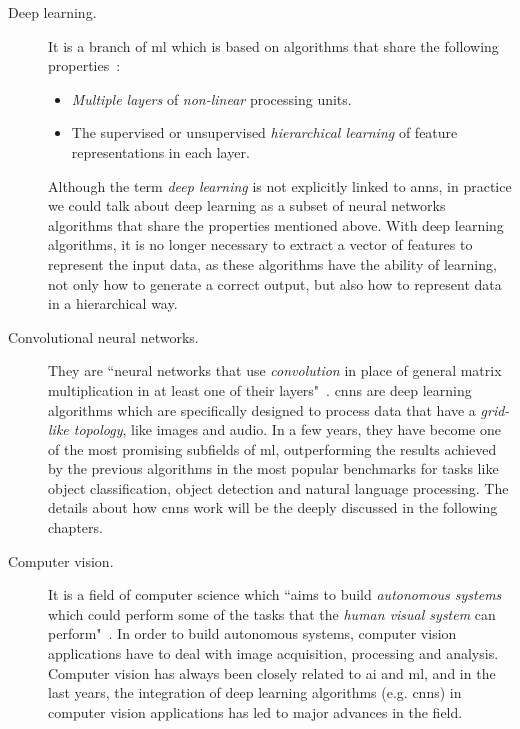 \begin{description}
	\item[Deep learning.] It is a branch of \gls{ml} which is based on algorithms that share the following properties~\cite{deep-learning-methods-and-applications}:
	\begin{itemize}
		\item \emph{Multiple layers} of \emph{non-linear} processing units.
		\item The supervised or unsupervised \emph{hierarchical learning} of feature representations in each layer.
	\end{itemize}
	
	Although the term \textit{deep learning} is not explicitly linked to \glspl{ann}, in practice we could talk about deep learning as a subset of neural networks algorithms that share the properties mentioned above. With deep learning algorithms, it is no longer necessary to extract a vector of features to represent the input data, as these algorithms have the ability of learning, not only how to generate a correct output, but also how to represent data in a hierarchical way.
\end{description}
\begin{description}
	\item[Convolutional neural networks.] They are ``neural networks that use \emph{convolution} in place of general matrix multiplication in at least one of their layers"~\cite{Goodfellow-et-al-2016}. \glspl{cnn} are deep learning algorithms which are specifically designed to process data that have a \emph{grid-like topology}, like images and audio. In a few years, they have become one of the most promising subfields of \gls{ml}, outperforming the results achieved by the previous algorithms in the most popular benchmarks for tasks like object classification, object detection and natural language processing. The details about how \glspl{cnn} work will be the deeply discussed in the following chapters.
\end{description}

\begin{description}
	\item[Computer vision.] It is a field of computer science which ``aims to build \emph{autonomous systems} which could perform some of the tasks that the \emph{human visual system} can perform"~\cite{huang1996computer}. In order to build autonomous systems, computer vision applications have to deal with image acquisition, processing and analysis. Computer vision has always been closely related to \gls{ai} and \gls{ml}, and in the last years, the integration of deep learning algorithms (e.g. \glspl{cnn}) in computer vision applications has led to major advances in the field.
\end{description}

